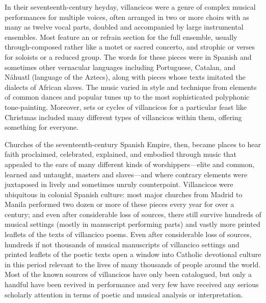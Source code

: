 In their seventeenth-century heyday, villancicos were a genre of complex musical
performances for multiple voices, often arranged in two or more choirs with as
many as twelve vocal parts, doubled and accompanied by large instrumental
ensembles.
Most feature an  or refrain section for the full ensemble,
usually through-composed rather like a motet or sacred concerto, and strophic
 or verses for soloists or a reduced group.
The words for these pieces were in Spanish and sometimes other vernacular
languages including Portuguese, Catalan, and Náhuatl (language of the Aztecs),
along with pieces whose texts imitated the dialects of African slaves.
The music varied in style and technique from elements of common dances
and popular tunes up to the most sophisticated polyphonic tone-painting.
Moreover, sets or cycles of villancicos for a particular feast like Christmas
included many different types of villancicos within them, offering something
for everyone.

Churches of the seventeenth-century Spanish Empire, then, became places to hear
faith proclaimed, celebrated, explained, and embodied through music that
appealed to the ears of many different kinds of worshippers---elite and common,
learned and untaught, masters and slaves---and where contrary elements were
juxtaposed in lively and sometimes unruly counterpoint.
Villancicos were ubiquitous in colonial Spanish culture: most major churches
from Madrid to Manila performed two dozen or more of these pieces every year
for over a century; and even after considerable loss of sources, there still
survive hundreds of musical settings (mostly in manuscript performing parts)
and vastly more printed leaflets of the texts of villancico poems.
Even after considerable loss of sources, hundreds if not thousands of musical
manuscripts of villancico settings and printed leaflets of the poetic texts
open a window into Catholic devotional culture in this period relevant to the
lives of many thousands of people around the world.
Most of the known sources of villancicos have only been catalogued, but only a
handful have been revived in performance and very few have received any serious
scholarly attention in terms of poetic and musical analysis or interpretation.

